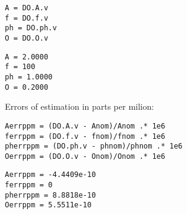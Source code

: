 \begin{lstlisting}
A = DO.A.v
f = DO.f.v
ph = DO.ph.v
O = DO.O.v
\end{lstlisting}
\begin{lstlisting}[language={},xleftmargin=5pt,frame=none]
A = 2.0000
f = 100
ph = 1.0000
O = 0.2000

\end{lstlisting}


Errors of estimation in parts per milion:

\begin{lstlisting}
Aerrppm = (DO.A.v - Anom)/Anom .* 1e6
ferrppm = (DO.f.v - fnom)/fnom .* 1e6
pherrppm = (DO.ph.v - phnom)/phnom .* 1e6
Oerrppm = (DO.O.v - Onom)/Onom .* 1e6
\end{lstlisting}
\begin{lstlisting}[language={},xleftmargin=5pt,frame=none]
Aerrppm = -4.4409e-10
ferrppm = 0
pherrppm = 8.8818e-10
Oerrppm = 5.5511e-10

\end{lstlisting}


\stopcontents[localtoc]
